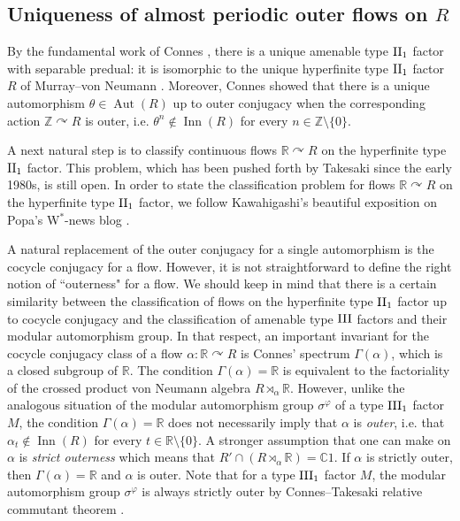 \documentclass[a4paper,11pt]{amsart}
\numberwithin{equation}{section}
\theoremstyle{definition}
\newcommand{\R}{\mathbb{R}}
\newcommand{\C}{\mathbb{C}}
\newcommand{\Z}{\mathbb{Z}}
\newcommand{\Aut}{\operatorname{Aut}}
\newcommand{\Inn}{\operatorname{Inn}}
\newcommand{\II}{{\rm II}}
\newcommand{\III}{{\rm III}}
\begin{document}
\subsection{Uniqueness of almost periodic outer flows on $R$}

By the fundamental work of Connes \cite{Co75b}, there is a unique amenable type $\II_1$ factor with separable predual: it is isomorphic to the unique hyperfinite type $\II_1$ factor $R$ of Murray--von Neumann \cite{MvN43}. Moreover, Connes \cite{Co75a} showed that there is a unique automorphism $\theta \in \Aut(R)$ up to outer conjugacy when the corresponding action $\Z \curvearrowright R$ is outer, i.e.\! $\theta^n \notin \Inn(R)$ for every $n \in \Z \setminus \{0\}$. 

A next natural step is to classify continuous flows $\R \curvearrowright R$ on the hyperfinite type $\II_1$ factor. This problem, which has been pushed forth by Takesaki since the early 1980s, is still open. In order to state the classification problem for flows $\R \curvearrowright R$ on the hyperfinite type $\II_1$ factor, we follow Kawahigashi's beautiful exposition on Popa's W$^*$-news blog \cite{Po25}.

A natural replacement of the outer conjugacy for a single automorphism is the cocycle conjugacy for a flow. However, it is not straightforward to define the right notion of ``outerness" for a flow. We should keep in mind that there is a certain similarity between the classification of flows on the hyperfinite type $\II_1$ factor up to cocycle conjugacy and the classification of amenable type $\III$ factors and their modular automorphism group. In that respect, an important invariant for the cocycle conjugacy class of a flow $\alpha : \R \curvearrowright R$ is Connes'\! spectrum $\Gamma(\alpha)$, which is a closed subgroup of $\R$. The condition $\Gamma(\alpha) = \R$ is equivalent to the factoriality of the crossed product von Neumann algebra $R \rtimes_\alpha \R$. However, unlike the analogous situation of the modular automorphism group $\sigma^\varphi$ of a type $\III_1$ factor $M$, the condition $\Gamma(\alpha) = \R$ does not necessarily imply that $\alpha$ is \emph{outer}, i.e.\! that $\alpha_t \notin \Inn(R)$ for every $t \in \R \setminus \{0\}$. A stronger assumption that one can make on $\alpha$ is \emph{strict outerness} which means that $R' \cap (R \rtimes_\alpha \R)=\C1$. If $\alpha$ is strictly outer, then $\Gamma(\alpha)=\R$ and $\alpha$ is outer. Note that for a type $\III_1$ factor $M$, the modular automorphism group $\sigma^\varphi$ is always strictly outer by Connes--Takesaki relative commutant theorem \cite{CT76}.
\end{document}
